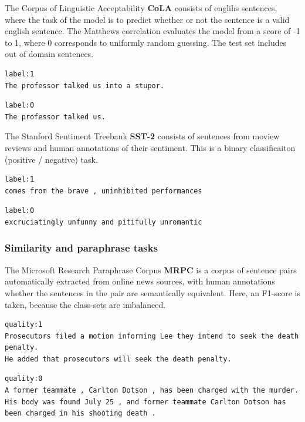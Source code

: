 \documentclass[a4paper,12pt,twoside,openright]{report}
\begin{document}
The Corpus of Linguistic Acceptability \textbf{CoLA} \cite{warstadt2018} consists of englihs sentences, where the task of the model is to predict whether or not the sentence is a valid english sentence.
The Matthews correlation evaluates the model from a score of -1 to 1, where 0 corresponds to uniformly random guessing.
The test set includes out of domain sentences.

\begin{verbatim}
label:1
The professor talked us into a stupor.
\end{verbatim}

\begin{verbatim}
label:0	
The professor talked us.
\end{verbatim}


The Stanford Sentiment Treebank \textbf{SST-2} \cite{socher2013} consists of sentences from moview reviews and human annotations of their sentiment.
This is a binary classificaiton (positive / negative) task.


\begin{verbatim}
label:1
comes from the brave , uninhibited performances
\end{verbatim}

\begin{verbatim}
label:0
excruciatingly unfunny and pitifully unromantic
\end{verbatim}

\subsubsection{Similarity and paraphrase tasks}

The Microsoft Research Paraphrase Corpus \textbf{MRPC} \cite{dolan2005} is a corpus of sentence pairs automatically extracted from online news sources, with human annotations whether the sentences in the pair are semantically equivalent.
Here, an F1-score is taken, because the class-sets are imbalanced.


\begin{verbatim}
quality:1	
Prosecutors filed a motion informing Lee they intend to seek the death penalty.	
He added that prosecutors will seek the death penalty.
\end{verbatim}

\begin{verbatim}
quality:0	
A former teammate , Carlton Dotson , has been charged with the murder.	
His body was found July 25 , and former teammate Carlton Dotson has been charged in his shooting death .
\end{verbatim}
\end{document}
